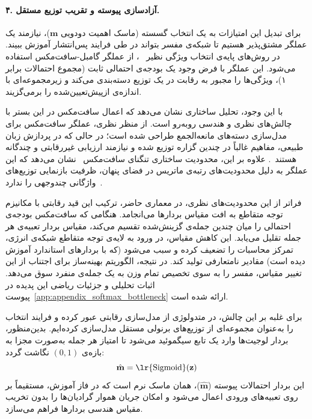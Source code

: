 \paragraph{۴. آزادسازی پیوسته و تقریب توزیع مستقل.}
برای تبدیل این امتیازات به یک انتخاب گسسته (ماسک اهمیت دودویی $\mathbf{m}$)، نیازمند یک عملگر مشتق‌پذیر هستیم تا شبکه‌ی مفسر بتواند در طی فرایند پس‌انتشار آموزش ببیند. در روش‌های پایه‌ی انتخاب ویژگی نظیر ~\cite{chen2018learning}، از عملگر گامبل-سافت‌مکس استفاده می‌شود. این عملگر با فرض وجود یک بودجه‌ی احتمالی ثابت (مجموع احتمالات برابر ۱)، ویژگی‌ها را مجبور به رقابت در یک توزیع دسته‌بندی می‌کند و زیرمجموعه‌ای با اندازه‌ی ازپیش‌تعیین‌شده را برمی‌گزیند.

با این وجود، تحلیل ساختاری نشان می‌دهد که اعمال سافت‌مکس در این بستر با چالش‌های نظری و هندسی روبه‌رو است. از منظر نظری، عملگر سافت‌مکس برای مدل‌سازی دسته‌های مانعه‌الجمع طراحی شده است؛ در حالی که در پردازش زبان طبیعی، مفاهیم غالباً در چندین گزاره توزیع شده و نیازمند ارزیابی غیررقابتی و چندگانه هستند~\cite{stahlberg2022jam}. علاوه بر این، محدودیت ساختاری تنگنای سافت‌مکس~\cite{yang2018breaking} نشان می‌دهد که این عملگر به دلیل محدودیت‌های رتبه‌ی ماتریس در فضای پنهان، ظرفیت بازنمایی توزیع‌های واژگانی چندوجهی را ندارد~\cite{chang2022softmax}.

فراتر از این محدودیت‌های نظری، در معماری حاضر، ترکیب این قید رقابتی با مکانیزم توجه متقاطع به افت مقیاس بردارها می‌انجامد. هنگامی که سافت‌مکس بودجه‌ی احتمالی را میان چندین جمله‌ی گزینش‌شده تقسیم می‌کند، مقیاس بردار تعبیه‌ی هر جمله تقلیل می‌یابد. این کاهش مقیاس، در ورود به لایه‌ی توجه متقاطع شبکه‌ی انرژی، تمرکز محاسبات را تضعیف کرده و سبب می‌شود  (که با بردارهای استاندارد آموزش دیده است) مقادیر نامتعارفی تولید کند. در نتیجه، الگوریتم بهینه‌ساز برای اجتناب از این تغییر مقیاس، مفسر را به سوی تخصیص تمام وزن به یک جمله‌ی منفرد سوق می‌دهد. اثبات تحلیلی و جزئیات ریاضی این پدیده در پیوست~\ref{app:appendix_softmax_bottleneck} ارائه شده است.

برای غلبه بر این چالش، در متدولوژی  از مدل‌سازی رقابتی عبور کرده و فرایند انتخاب را به‌عنوان مجموعه‌ای از توزیع‌های برنولی مستقل مدل‌سازی کرده‌ایم. بدین‌منظور، بردار لوجیت‌ها وارد یک تابع سیگموئید می‌شود تا امتیاز هر جمله به‌صورت مجزا به بازه‌ی $(0, 1)$ نگاشت گردد:
\begin{equation}\label{eq:chap4_interp_sigmoid}
    \hat{\mathbf{m}} = \text{\lr{Sigmoid}}(\mathbf{z})
\end{equation}
این بردار احتمالات پیوسته ($\hat{\mathbf{m}}$)، همان ماسک نرم است که در فاز آموزش، مستقیماً بر روی تعبیه‌های ورودی اعمال می‌شود و امکان جریان هموار گرادیان‌ها را بدون تخریب مقیاس هندسی بردارها فراهم می‌سازد.

